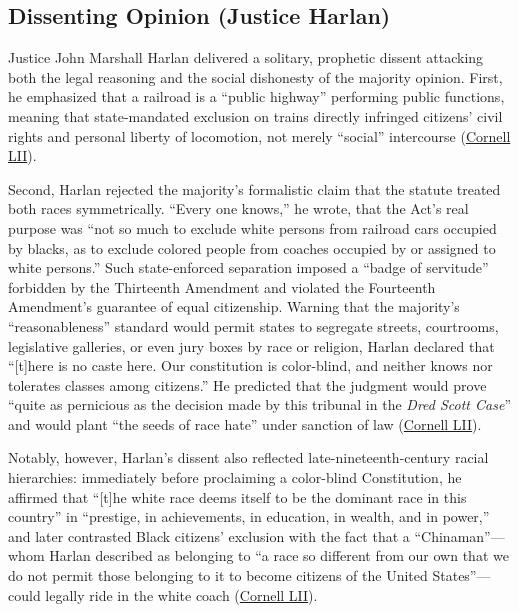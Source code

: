 \documentclass[12pt]{article}
\begin{document}
\subsection{Dissenting Opinion (Justice Harlan)}

Justice John Marshall Harlan delivered a solitary, prophetic dissent attacking both the legal reasoning and the social dishonesty of the majority opinion. First, he emphasized that a railroad is a ``public highway'' performing public functions, meaning that state-mandated exclusion on trains directly infringed citizens' civil rights and personal liberty of locomotion, not merely ``social'' intercourse (\href{https://www.law.cornell.edu/supremecourt/text/163/537}{Cornell LII}).

Second, Harlan rejected the majority's formalistic claim that the statute treated both races symmetrically. ``Every one knows,'' he wrote, that the Act's real purpose was ``not so much to exclude white persons from railroad cars occupied by blacks, as to exclude colored people from coaches occupied by or assigned to white persons.'' Such state-enforced separation imposed a ``badge of servitude'' forbidden by the Thirteenth Amendment and violated the Fourteenth Amendment's guarantee of equal citizenship. Warning that the majority's ``reasonableness'' standard would permit states to segregate streets, courtrooms, legislative galleries, or even jury boxes by race or religion, Harlan declared that ``[t]here is no caste here. Our constitution is color-blind, and neither knows nor tolerates classes among citizens.'' He predicted that the judgment would prove ``quite as pernicious as the decision made by this tribunal in the \textit{Dred Scott Case}'' and would plant ``the seeds of race hate'' under sanction of law (\href{https://www.law.cornell.edu/supremecourt/text/163/537}{Cornell LII}).

Notably, however, Harlan's dissent also reflected late-nineteenth-century racial hierarchies: immediately before proclaiming a color-blind Constitution, he affirmed that ``[t]he white race deems itself to be the dominant race in this country'' in ``prestige, in achievements, in education, in wealth, and in power,'' and later contrasted Black citizens' exclusion with the fact that a ``Chinaman''---whom Harlan described as belonging to ``a race so different from our own that we do not permit those belonging to it to become citizens of the United States''---could legally ride in the white coach (\href{https://www.law.cornell.edu/supremecourt/text/163/537}{Cornell LII}).
\end{document}
